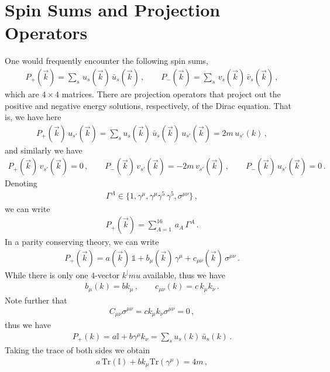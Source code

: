 \documentclass[11pt, onesided]{book}
\theoremstyle{break}
\theoremstyle{break}
\begin{document}
\section[Spin Sums and Projection Operators]{Spin Sums and Projection Operators}
One would frequently encounter the following spin sums, 
\begin{align*}
P_+(\vec{k}) = \sum_s \, u_s(\vec{k}) \, \bar{u}_s(\vec{k})\,,\qquad
P_-(\vec{k}) = \sum_s \, v_s(\vec{k}) \, \bar{v}_s(\vec{k})\,,
\end{align*}
which are $4\times 4$ matrices. There are projection operators that project out the 
positive and negative energy solutions, respectively, of the Dirac equation. That is, we have here
\begin{align*}
P_+(\vec{k}) \, u_{s'}(\vec{k}) = \sum_s u_s(\vec{k})\, \bar{u}_s(\vec{k}) \, u_{s'}(\vec{k}) = 2m\, u_{s'}(k)\,,
\end{align*}
and similarly we have
\begin{align*}
P_+(\vec{k}) \, v_{s'}(\vec{k}) = 0\,,\qquad
P_-(\vec{k}) \, v_{s'}(\vec{k}) = -2m\, v_{s'}(\vec{k})\,,\qquad
P_-(\vec{k})\, u_{s'}(\vec{k}) = 0\,.
\end{align*}
Denoting
\begin{align*}
\Gamma^A \in \{ 1, \gamma^\mu, \gamma^\mu \gamma^5\, \gamma^5, \sigma^{\mu\nu}\}\,,
\end{align*}
we can write
\begin{align*}
P_+(\vec{k}) = \sum_{A= 1}^{16}\, a_A \, \Gamma^A\,.
\end{align*}
In a parity conserving theory, we can write
\begin{align*}
P_+(\vec{k}) = a(\vec{k})\, \mathbb{1} + b_\mu(\vec{k})\, \gamma^\mu + c_{\mu\nu}(\vec{k}) \, \sigma^{\mu\nu}\,.
\end{align*}
While there is only one $4$-vector $k^|mu$ available, thus we have
\begin{align*}
b_\mu(k) = bk_\mu \,,\qquad 
c_{\mu\nu}(k) = c\, k_\mu k_\nu\,. 
\end{align*}
Note further that 
\begin{align*}
C_{\mu\nu}\sigma^{\mu\nu} = ck_\mu k_\nu \sigma^{\mu\nu} = 0\,,
\end{align*}
thus we have
\begin{align}
P_+(k) = a\mathbb{I} + b \gamma^\mu k_\nu = \sum_s u_s(k)\, \bar{u}_s(k)\,.
\end{align}
Taking the trace of both sides we obtain
\begin{align*}
a\, \text{Tr}(\mathbb{I}) + bk_\mu \text{Tr}(\gamma^\mu) = 4m\,,
\end{align*}
\end{document}
